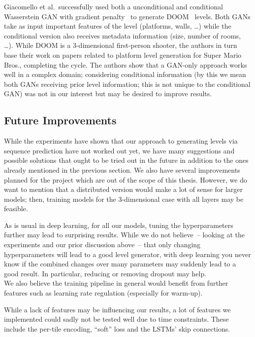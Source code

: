 
Giacomello et al.\ successfully used both a unconditional and
conditional Wasserstein GAN with gradient
penalty~\cite{gulrajaniImprovedTrainingWasserstein2017} to generate
DOOM~\cite{Doom1993Video2019} levels. Both GANs take as input
important features of the level (platforms, walls, \dots) while the
conditional version also receives metadata information (size, number
of rooms, \dots). While DOOM is a 3-dimensional first-person shooter,
the authors in turn base their work on papers related to platform
level generation for Super Mario Bros., completing the cycle. The
authors show that a GAN-only approach works well in a complex domain;
considering conditional information (by this we mean both GANs
receiving prior level information; this is not unique to the
conditional GAN) was not in our interest but may be desired to improve
results.

\subsection{Future Improvements}

While the experiments have shown that our approach to generating
levels via sequence prediction have not worked out yet, we have many
suggestions and possible solutions that ought to be tried out in the
future in addition to the ones already mentioned in the previous
section. We also have several improvements planned for the project
which are out of the scope of this thesis. However, we do want to
mention that a distributed version would make a lot of sense for
larger models; then, training models for the 3-dimensional case with
all layers may be feasible.

As is usual in deep learning, for all our models, tuning the
hyperparameters further may lead to surprising results. While we do
not believe~-- looking at the experiments and our prior discussion
above~-- that only changing hyperparameters will lead to a good level
generator, with deep learning you never know if the combined changes
over many parameters may suddenly lead to a good result. In
particular, reducing or removing dropout may help. \\
We also believe the training pipeline in general would benefit from
further features such as learning rate regulation (especially for
warm-up).

While a lack of features may be influencing our results, a lot of
features we implemented could sadly not be tested well due to time
constraints. These include the per-tile encoding, ``soft'' loss and
the LSTMs' skip connections.

